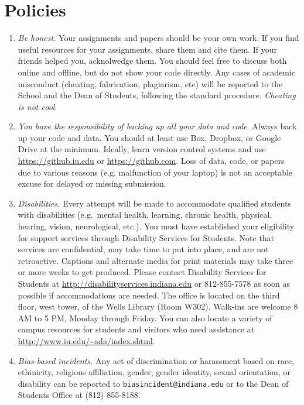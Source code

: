 \documentclass[11pt,article,oneside]{memoir} %
\begin{document}
\section{Policies}%
\begin{enumerate}%

\item \emph{Be honest.} Your assignments and papers should be your own work.  
If you find useful resources for your assignments, share them and cite them. 
If your friends helped you, acknolwedge them. 
You should feel free to discuss both online and offline, but do not show your code directly.  
Any cases of academic misconduct (cheating, fabrication, plagiarism, etc) will be reported to the School and the Dean of Students, following the standard procedure. 
\emph{Cheating is not cool}. 

\item \emph{You have the responsibility of backing up all your data and code}.
Always back up your code and data. You should at least use Box, Dropbox, or Google Drive at the minimum.
Ideally, learn version control systems and use \url{https://github.iu.edu} or \url{https://github.com}. 
Loss of data, code, or papers due to various reasons (e.g. malfunction of your laptop) is not an acceptable excuse for delayed or missing submission. 

\item \emph{Disabilities.} Every attempt will be made to accommodate qualified
students with disabilities (e.g.~mental health, learning, chronic health,
physical, hearing, vision, neurological, etc.). You must have established your
eligibility for support services through Disability Services for Students. Note
that services are confidential, may take time to put into place, and are not
retroactive.  Captions and alternate media for print materials may take three
or more weeks to get produced. Please contact Disability Services for Students
at \url{http://disabilityservices.indiana.edu} or 812-855-7578 as soon as
possible if accommodations are needed. The office is located on the third
floor, west tower, of the Wells Library (Room W302). Walk-ins are welcome 8 AM
to 5 PM, Monday through Friday. You can also locate a variety of campus
resources for students and visitors who need assistance at
\url{http://www.iu.edu/~ada/index.shtml}. 

\item \emph{Bias-based incidents.} Any act of discrimination or harassment based on 
race, ethinicity, religious affiliation, gender, gender identity, sexual orientation, or
disability can be reported to \texttt{biasincident@indiana.edu} or to the Dean of Students Office at (812) 855-8188. 


\end{enumerate}
\end{document}
